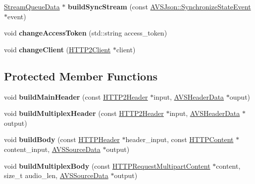\begin{DoxyCompactItemize}
\item 
\mbox{\label{classAVSRequestBuilder_acc396d71f3678aa9d90b548adec9bbb7}} 
\hyperlink{structNetwork_1_1HTTP2_1_1StreamQueueData}{Stream\+Queue\+Data} $\ast$ {\bfseries build\+Sync\+Stream} (const \hyperlink{structAVSJson_1_1SynchronizeStateEvent}{A\+V\+S\+Json\+::\+Synchronize\+State\+Event} $\ast$event)
\item 
\mbox{\label{classAVSRequestBuilder_a9ae18a6d37d3d62d964c275f5a2f3d7f}} 
void {\bfseries change\+Access\+Token} (std\+::string access\+\_\+token)
\item 
\mbox{\label{classAVSRequestBuilder_a2aa434deae2d8ad4cc43b855c43d404a}} 
void {\bfseries change\+Client} (\hyperlink{classNetwork_1_1HTTP2_1_1HTTP2Client}{H\+T\+T\+P2\+Client} $\ast$client)
\end{DoxyCompactItemize}
\subsection*{Protected Member Functions}
\begin{DoxyCompactItemize}
\item 
\mbox{\label{classAVSRequestBuilder_ae70a64a49dbef9eb3c01d5a56d68bfba}} 
void {\bfseries build\+Main\+Header} (const \hyperlink{classNetwork_1_1HTTP_1_1HTTP2Header}{H\+T\+T\+P2\+Header} $\ast$input, \hyperlink{structAVSHeaderData}{A\+V\+S\+Header\+Data} $\ast$ouput)
\item 
\mbox{\label{classAVSRequestBuilder_a595c9a1f89f2ed0da5b6b2b4137183aa}} 
void {\bfseries build\+Multiplex\+Header} (const \hyperlink{classNetwork_1_1HTTP_1_1HTTP2Header}{H\+T\+T\+P2\+Header} $\ast$input, \hyperlink{structAVSHeaderData}{A\+V\+S\+Header\+Data} $\ast$output)
\item 
\mbox{\label{classAVSRequestBuilder_a41d9b3cc515effb6aea81efa5f15fc1d}} 
void {\bfseries build\+Body} (const \hyperlink{classNetwork_1_1HTTP_1_1HTTPHeader}{H\+T\+T\+P\+Header} $\ast$header\+\_\+input, const \hyperlink{classNetwork_1_1HTTP_1_1HTTPContent}{H\+T\+T\+P\+Content} $\ast$content\+\_\+input, \hyperlink{structAVSSourceData}{A\+V\+S\+Source\+Data} $\ast$output)
\item 
\mbox{\label{classAVSRequestBuilder_a47e5a6f6feb90aa90b64b1b2b52ad8b2}} 
void {\bfseries build\+Multiplex\+Body} (const \hyperlink{structNetwork_1_1HTTP_1_1HTTPRequestMultipartContent}{H\+T\+T\+P\+Request\+Multipart\+Content} $\ast$content, size\+\_\+t audio\+\_\+len, \hyperlink{structAVSSourceData}{A\+V\+S\+Source\+Data} $\ast$output)
\end{DoxyCompactItemize}


